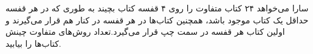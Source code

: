 \p
سارا می‌خواهد ۲۴ کتاب متفاوت را روی ۴ قفسه کتاب بچیند به طوری که در هر قفسه حداقل یک کتاب موجود باشد، همچنین کتاب‌ها در هر قفسه در کنار هم قرار می‌گیرند و اولین کتاب هر قفسه در سمت چپ قرار می‌گیرد.تعداد روش‌های متفاوت چینش کتاب‌ها را بیابید.